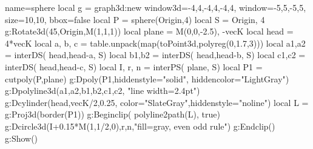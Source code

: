 \documentclass[border=5pt]{standalone}
\begin{document}
\begin{luadraw}{name=sphere}
    local g = graph3d:new{
        window3d={-4,4,-4,4,-4,4},
        window={-5,5,-5,5},
        size={10,10}, bbox=false
    }
    local P = sphere(Origin,4)
    local S = {Origin, 4}
    g:Rotate3d(45,{Origin,M(1,1,1)})
    local plane = {M(0,0,-2.5), -vecK}
    local head = 4*vecK
    local a, b, c = table.unpack(map(toPoint3d,polyreg(0,1.7,3)))
    local a1,a2 = interDS( {head,head-a}, S)
    local b1,b2 = interDS( {head,head-b}, S)
    local c1,c2 = interDS( {head,head-c}, S)
    local I, r, n = interPS( plane, S)
    local P1 = cutpoly(P,plane)
    g:Dpoly(P1,{hiddenstyle="solid", hiddencolor="LightGray"})
    g:Dpolyline3d({{a1,a2},{b1,b2},{c1,c2}}, "line width=2.4pt")
    g:Dcylinder(head,vecK/2,0.25, {color="SlateGray",hiddenstyle="noline"})
    local L = g:Proj3d(border(P1))
    g:Beginclip( polyline2path(L), true)
        g:Dcircle3d(I+0.15*M(1,1/2,0),r,n,"fill=gray, even odd rule")
    g:Endclip()
    g:Show()
\end{luadraw}
\end{document}
